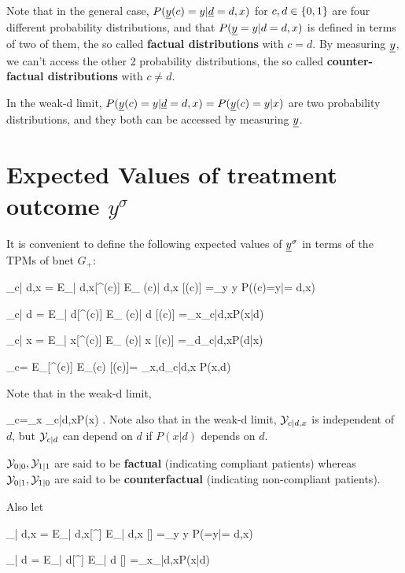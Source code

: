 Note that in the general case,
$P({\underline{y}}(c)=y|{\underline{d}}=d, x)$
for $c, d\in \{0,1\}$
are four 
different probability 
distributions,
and that 
$P({\underline{y}}=y|d=d,x)$
is defined in terms
of two of them, the
so called {\bf factual
distributions} with $c=d$.
By measuring ${\underline{y}}$,
we can't access the other
2 probability distributions,
the so called {\bf counter-factual
distributions}
with $c\neq d$.

In the weak-d limit, 
$P({\underline{y}}(c)=y|{\underline{d}}=d, x
)=P({\underline{y}}(c)=y|x)$ are 
two probability
distributions, 
and they both
can be accessed 
by measuring ${\underline{y}}$.





\section{Expected Values of
 treatment outcome $y^\sigma$}

It is convenient
to define
the following
expected values of
${\underline{y}}^\sigma$
in terms of the TPMs of
bnet $G_{+}$:

\beq
\caly_{c| d,x}
=
E_{\s| d,x}[\rvy^\s(c)]
\rarrow
E_{ \rvy(c)| d,x} [\rvy(c)]
=\sum_{y} y
P(\rvy(c)=y|\rvd= d,x)
\label{eq-need-positivity}
\eeq

\beq
\caly_{c| d}
=
E_{\s| d}[\rvy^\s(c)]
\rarrow
E_{ \rvy(c)| d} [\rvy(c)]
=\sum_x\caly_{c|d,x}P(x|d)
\eeq

\beq
\caly_{c| x}
=
E_{\s| x}[\rvy^\s(c)]
\rarrow
E_{ \rvy(c)| x} [\rvy(c)]
=\sum_d\caly_{c|d,x}P(d|x)
\eeq


\beq
\caly_c=
E_{\s}[\rvy^\s(c)]
\rarrow
E_{\rvy(c)} [\rvy(c)]=
\sum_{x,d}\caly_{c|d,x} P(x,d)
\eeq

Note that in the weak-d limit,


\beq
\caly_c=\sum_x \caly_{c|d,x}P(x)
\;.
\eeq
Note also that in the weak-d limit,
${\cal Y}_{c|d, x}$ is independent
of $d$,
but ${\cal Y}_{c|d}$
can depend on $d$
if $P(x|d)$ depends on $d$.


${\cal Y}_{0|0}, {\cal Y}_{1|1}$
are said to be {\bf factual} 
(indicating compliant patients)
whereas 
${\cal Y}_{0|1}, {\cal Y}_{1|0}$
are said to be {\bf counterfactual} 
(indicating non-compliant patients).

Also let

\beq
\caly_{| d,x}
=
E_{\s| d,x}[\rvy^\s]
\rarrow
E_{\rvy| d,x} [\rvy]
=\sum_{y} y
P(\rvy=y|\rvd= d,x)
\eeq


\beq
\caly_{| d}
=
E_{\s| d}[\rvy^\s]
\rarrow
E_{\rvy| d} [\rvy]
=\sum_x\caly_{|d,x}P(x|d)
\eeq


